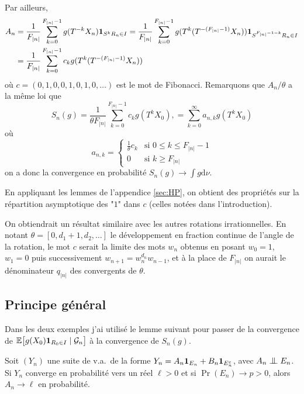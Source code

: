 \documentclass[12pt,a4paper]{article}
\begin{document}
%
Par ailleurs, 
\begin{align*}
A_n & = \frac{1}{F_{|n|}}\sum_{k=0}^{F_{|n|}-1} g(T^{-k}X_n) \boldsymbol 1_{S^k R_n \in I}
  = \frac{1}{F_{|n|}}\sum_{k=0}^{F_{|n|}-1} g(T^k(T^{-(F_{|n|}-1)}X_n)) \boldsymbol 1_{S^{F_{|n|}-1-k} R_n \in I} 
 \\ & = \frac{1}{F_{|n|}}\sum_{k=0}^{F_{|n|}-1} c_k g(T^k(T^{-(F_{|n|}-1)}X_n)) 
\end{align*}
où $c = (0, 1, 0, 0, 1, 0, 1, 0, \ldots)$ est le mot de Fibonacci.
Remarquons que $A_n/\theta$ a la même loi que 
$$
S_n(g) = \frac{1}{\theta F_{|n|}}\sum_{k=0}^{F_{|n|}-1} c_k g(T^kX_0),  
= \sum_{k=0}^\infty a_{n,k} g(T^kX_0) 
$$ 
où
$$
a_{n,k} = \begin{cases}
\frac{1}{\theta} c_k & \text{si $0 \leq k \leq F_{|n|}-1$} \\
0 & \text{si $k \geq F_{|n|}$}
\end{cases}
$$
on a donc la convergence en probabilité $S_n(g) \to \int g \mathrm{d}\nu$. 

En appliquant les lemmes de l'appendice \ref{sec:HP}, on obtient des 
propriétés sur la répartition asymptotique des "$1$" dans $c$ 
(celles notées dans l'introduction).  

On obtiendrait un résultat similaire avec les autres rotations irrationnelles. 
En notant $\theta = [0, d_1+1, d_2, \ldots]$ le développement en fraction 
continue de l'angle de la rotation, le mot $c$ serait la limite des mots 
$w_n$ obtenus en posant $w_0=1$, $w_1=0$ puis successivement 
$w_{n+1}=w_n^{d_n}w_{n-1}$, et à la place de $F_{|n|}$ on aurait le 
dénominateur $q_{|n|}$ des convergents de $\theta$. 


\subsection{Principe général}

Dans les deux exemples j'ai utilisé le lemme suivant pour passer de la convergence 
de $\mathbb{E}\bigl[g(X_0) \boldsymbol 1_{R_0 \in I} \mid \mathcal{G}_n\bigr]$ à la convergence de 
$S_n(g)$. 

\begin{lemme}\label{lemme:convergence}
Soit $(Y_n)$ une suite de v.a.\ de la forme 
$Y_n = A_n \boldsymbol 1_{E_n} + B_n \boldsymbol 1_{E_n^c}$, 
avec $A_n \indep E_n$.
Si $Y_n$ converge en probabilité vers un réel $\ell>0$ et si $\Pr(E_n) \to p>0$, 
alors $A_n \to \ell$ en probabilité.
\end{lemme}
\end{document}

